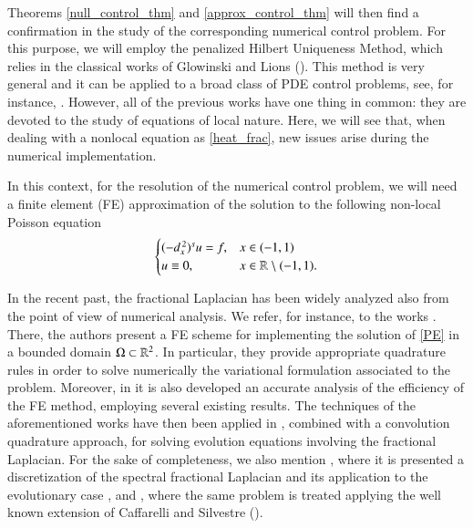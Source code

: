 Theorems \ref{null_control_thm} and \ref{approx_control_thm} will then find a confirmation in the study of the corresponding numerical control problem. For this purpose, we will employ the penalized Hilbert Uniqueness Method, which relies in the classical works of Glowinski and Lions (\cite{glowinski1995exact,glowinski2008exact}). This method is very general and it can be applied to a broad class of PDE control problems, see, for instance, \cite{boyer2013penalised,boyer2017insensitizing,boyer2014approximate,khodja2017partial}. However, all of the previous works have one thing in common: they are devoted to the study of equations of local nature. Here, we will see that, when dealing with a nonlocal equation as \eqref{heat_frac}, new issues arise during the numerical implementation. 

In this context, for the resolution of the numerical control problem, we will need a finite element (FE)  approximation of the solution to the following non-local Poisson equation
\begin{align}\label{PE}
	\begin{cases}
		(-d_x^{\,2})^{s}u = f, & x\in(-1,1)
		\\
		u\equiv 0, & x\in\mathbb{R}\setminus(-1,1).
	\end{cases}
\end{align}

In the recent past, the fractional Laplacian has been widely analyzed also from the point of view of numerical analysis. We refer, for instance, to the works \cite{acosta2017short,acosta2017fractional,borthagaray2017laplaciano}. There, the authors present a FE scheme for implementing the solution of \eqref{PE} in a bounded domain $\Omega\subset\mathbb{R}^2$. In particular, they provide appropriate quadrature rules in order to solve numerically the variational formulation associated to the problem. Moreover, in \cite{acosta2017fractional,borthagaray2017laplaciano} it is also developed an accurate analysis of the efficiency of the FE method, employing several existing results. The techniques of the aforementioned works have then been applied in \cite{acosta2017finite}, combined with a convolution quadrature approach, for solving evolution equations involving the fractional Laplacian. For the sake of completeness, we also mention \cite{bonito2015numerical}, where it is presented a discretization of the spectral fractional Laplacian and its application to the evolutionary case \cite{bonito2017approximation}, and \cite{nochetto2015pde}, where the same problem is treated applying the well known extension of Caffarelli and Silvestre (\cite{caffarelli2007extension}).   

